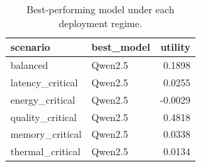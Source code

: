 \begin{table}
\caption{Best-performing model under each deployment regime.}
\label{tab:scenario_winners}
\begin{tabular}{llr}
\toprule
scenario & best_model & utility \\
\midrule
balanced & Qwen2.5 & 0.1898 \\
latency_critical & Qwen2.5 & 0.0255 \\
energy_critical & Qwen2.5 & -0.0029 \\
quality_critical & Qwen2.5 & 0.4818 \\
memory_critical & Qwen2.5 & 0.0338 \\
thermal_critical & Qwen2.5 & 0.0134 \\
\bottomrule
\end{tabular}
\end{table}
